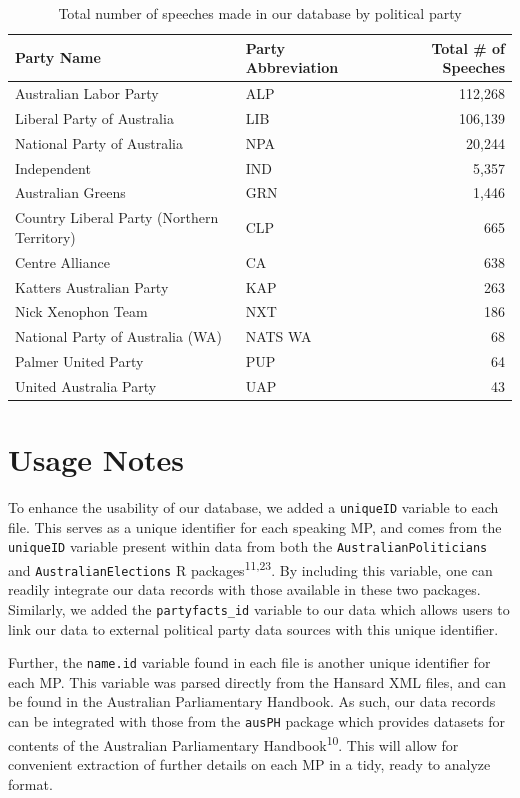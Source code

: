 \documentclass[
  letterpaper,
  DIV=11,
  numbers=noendperiod]{scrartcl}
\begin{document}
\hypertarget{tbl-speeches_by_party}{}
\begin{table}[H]
\caption{\label{tbl-speeches_by_party}Total number of speeches made in our database by political party }\tabularnewline

\centering
\begin{tabular}{llr}
\toprule
Party Name & Party Abbreviation & Total \# of Speeches\\
\midrule
Australian Labor Party & ALP & 112,268\\
Liberal Party of Australia & LIB & 106,139\\
National Party of Australia & NPA & 20,244\\
Independent & IND & 5,357\\
Australian Greens & GRN & 1,446\\
\addlinespace
Country Liberal Party (Northern Territory) & CLP & 665\\
Centre Alliance & CA & 638\\
Katters Australian Party & KAP & 263\\
Nick Xenophon Team & NXT & 186\\
National Party of Australia (WA) & NATS WA & 68\\
\addlinespace
Palmer United Party & PUP & 64\\
United Australia Party & UAP & 43\\
\bottomrule
\end{tabular}
\end{table}

\hypertarget{sec-usage}{%
\section{Usage Notes}\label{sec-usage}}

To enhance the usability of our database, we added a \texttt{uniqueID}
variable to each file. This serves as a unique identifier for each
speaking MP, and comes from the \texttt{uniqueID} variable present
within data from both the \texttt{AustralianPoliticians} and
\texttt{AustralianElections} R packages\textsuperscript{11,23}. By
including this variable, one can readily integrate our data records with
those available in these two packages. Similarly, we added the
\texttt{partyfacts\_id} variable to our data which allows users to link
our data to external political party data sources with this unique
identifier.

Further, the \texttt{name.id} variable found in each file is another
unique identifier for each MP. This variable was parsed directly from
the Hansard XML files, and can be found in the Australian Parliamentary
Handbook. As such, our data records can be integrated with those from
the \texttt{ausPH} package which provides datasets for contents of the
Australian Parliamentary Handbook\textsuperscript{10}. This will allow
for convenient extraction of further details on each MP in a tidy, ready
to analyze format.
\end{document}
